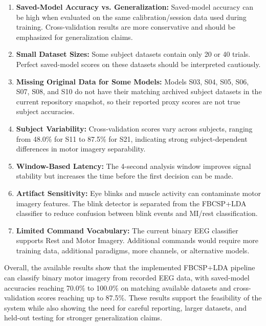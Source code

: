 \begin{enumerate}
    \item \textbf{Saved-Model Accuracy vs. Generalization:} Saved-model accuracy can be high when evaluated on the same calibration/session data used during training. Cross-validation results are more conservative and should be emphasized for generalization claims.
    \item \textbf{Small Dataset Sizes:} Some subject datasets contain only 20 or 40 trials. Perfect saved-model scores on these datasets should be interpreted cautiously.
    \item \textbf{Missing Original Data for Some Models:} Models S03, S04, S05, S06, S07, S08, and S10 do not have their matching archived subject datasets in the current repository snapshot, so their reported proxy scores are not true subject accuracies.
    \item \textbf{Subject Variability:} Cross-validation scores vary across subjects, ranging from 48.0\% for S11 to 87.5\% for S21, indicating strong subject-dependent differences in motor imagery separability.
    \item \textbf{Window-Based Latency:} The 4-second analysis window improves signal stability but increases the time before the first decision can be made.
    \item \textbf{Artifact Sensitivity:} Eye blinks and muscle activity can contaminate motor imagery features. The blink detector is separated from the FBCSP+LDA classifier to reduce confusion between blink events and MI/rest classification.
    \item \textbf{Limited Command Vocabulary:} The current binary EEG classifier supports Rest and Motor Imagery. Additional commands would require more training data, additional paradigms, more channels, or alternative models.
\end{enumerate}

Overall, the available results show that the implemented FBCSP+LDA pipeline can classify binary motor imagery from recorded EEG data, with saved-model accuracies reaching 70.0\% to 100.0\% on matching available datasets and cross-validation scores reaching up to 87.5\%. These results support the feasibility of the system while also showing the need for careful reporting, larger datasets, and held-out testing for stronger generalization claims.
